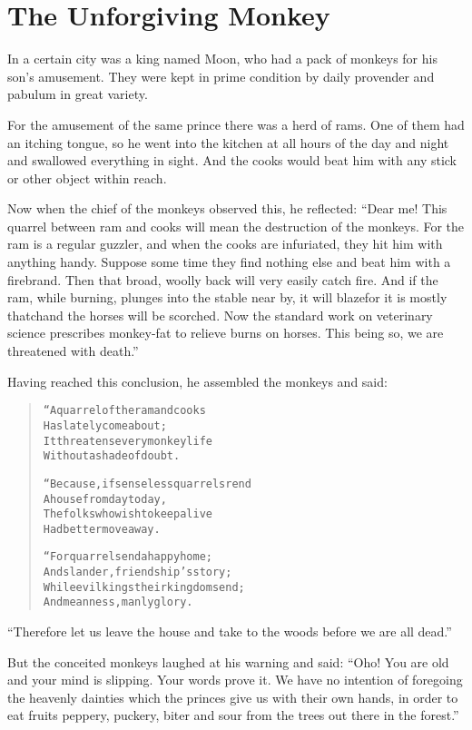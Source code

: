 \documentclass[article, twoside, 14pt]{memoir}
\renewenvironment{verbatim}{%
\begin{quote}%
\vskip -10pt%
\begin{alltt}\normalfont\large}{\end{alltt}%
\end{quote}%
\vskip -10pt
} %
\begin{document}
\chapter{The Unforgiving Monkey}

\label{s87}

In a certain city was a king named Moon, who had a pack of monkeys
for his son's amusement. They were kept in prime condition by daily
provender and pabulum in great variety.

For the amusement of the same prince there was a herd of rams. One
of them had an itching tongue, so he went into the kitchen at all
hours of the day and night and swallowed everything in sight. And
the cooks would beat him with any stick or other object within
reach.

Now when the chief of the monkeys observed this, he reflected:
``Dear me! This quarrel between ram and cooks will mean the destruction of the monkeys. For the ram is a regular guzzler, and when the cooks are infuriated, they hit him with anything handy. Suppose some time they find nothing else and beat him with a firebrand. Then that broad, woolly back will very easily catch fire. And if the ram, while burning, plunges into the stable near by, it will blaze{\textemdash}for it is mostly thatch{\textemdash}and the horses will be scorched. Now the standard work on veterinary science prescribes monkey-fat to relieve burns on horses. This being so, we are threatened with death.''

Having reached this conclusion, he assembled the monkeys and said:


\begin{verbatim}
“A quarrel of the ram and cooks
    Has lately come about;
It threatens every monkey life
    Without a shade of doubt.

“Because, if senseless quarrels rend
    A house from day to day,
The folks who wish to keep alive
    Had better move away.

“For quarrels end a happy home;
    And slander, friendship's story;
While evil kings their kingdoms end;
    And meanness, manly glory.
\end{verbatim}
``Therefore let us leave the house and take to the woods before we are all dead.''

But the conceited monkeys laughed at his warning and said:
``Oho! You are old and your mind is slipping. Your words prove it. We have no intention of foregoing the heavenly dainties which the princes give us with their own hands, in order to eat fruits peppery, puckery, biter and sour from the trees out there in the forest.''
\end{document}
